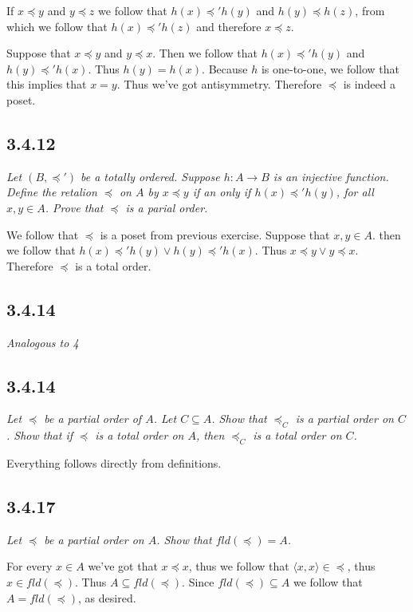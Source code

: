\documentclass[11pt,oneside,titlepage]{book}
\newcommand{\eangle}[1]{\langle #1 \rangle}
\begin{document}
If $x \preceq y$ and $y \preceq z$ we follow that $h(x) \preceq' h(y)$ and $h(y) \preceq h(z)$,
from which we follow that $h(x) \preceq' h(z)$ and therefore $x \preceq z$.

Suppose that $x \preceq y$ and $y \preceq x$. Then we follow that $h(x) \preceq' h(y)$
and $h(y) \preceq' h(x)$. Thus $h(y) = h(x)$. Because $h$ is one-to-one, we follow that
this implies that $x = y$. Thus we've got antisymmetry. Therefore $\preceq$ is indeed a poset.

\subsection*{3.4.12}

\textit{Let $(B, \preceq')$ be a totally ordered. Suppose $h: A \to B$ is an injective function.
  Define the retalion $\preceq$ on $A$ by $x \preceq y$ if an only if $h(x) \preceq' h(y)$,
  for all $x, y \in A$. Prove that $\preceq$ is a parial order.}

We follow that $\preceq$ is a poset from previous exercise. Suppose that $x, y \in A$.
then we follow that $h(x) \preceq' h(y) \lor h(y) \preceq' h(x)$. Thus
$x \preceq y \lor y \preceq x$. Therefore $\preceq$ is a total order.

\subsection*{3.4.14}

\textit{Analogous to 4}

\subsection*{3.4.14}

\textit{Let $\preceq$ be a partial order of $A$. Let $C \subseteq A$. Show that
  $\preceq_C$ is a partial order on $C$. Show that if $\preceq$ is a total order on $A$,
  then $\preceq_C$ is a total order on $C$.}

Everything follows directly from definitions.

\subsection*{3.4.17}

\textit{Let $\preceq$ be a partial order on $A$. Show that $fld(\preceq) = A$.}

For every $x \in A$ we've got that 
$x \preceq x$, thus we follow that $\eangle{x, x} \in \preceq$, thus $x \in fld(\preceq)$.
Thus $A \subseteq fld(\preceq)$. Since $fld(\preceq) \subseteq A$
we follow that $A = fld(\preceq)$, as desired.
\end{document}
